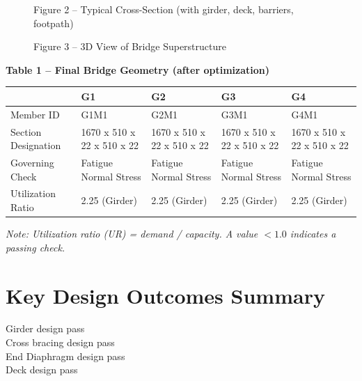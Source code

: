 \documentclass[12pt,a4paper]{report}
\numberwithin{table}{chapter}
\numberwithin{figure}{chapter}
\begin{document}
\newpage

\begin{figure}[H]
\centering
{}
\caption*{Figure 2 -- Typical Cross-Section (with girder, deck, barriers, footpath)}
\end{figure}

\begin{figure}[H]
\centering
{}
\caption*{Figure 3 -- 3D View of Bridge Superstructure}
\end{figure}

\noindent\textbf{Table 1 -- Final Bridge Geometry (after optimization)}

\vspace{0.4em}
\noindent
\begin{tabular}{|C{2.8cm}|C{3.0cm}|C{3.0cm}|C{3.0cm}|C{3.0cm}|}
\hline
  \textbf{} &
  \textbf{G1} &
  \textbf{G2} &
  \textbf{G3} &
  \textbf{G4} \\
\hline
Member ID & G1M1 & G2M1 & G3M1 & G4M1 \\
\hline
Section Designation & 1670 x 510 x 22 x 510 x 22 & 1670 x 510 x 22 x 510 x 22 & 1670 x 510 x 22 x 510 x 22 & 1670 x 510 x 22 x 510 x 22 \\
\hline
Governing Check & Fatigue Normal Stress & Fatigue Normal Stress & Fatigue Normal Stress & Fatigue Normal Stress \\
\hline
Utilization Ratio & 2.25 (Girder) & 2.25 (Girder) & 2.25 (Girder) & 2.25 (Girder) \\
\hline
\end{tabular}

\vspace{0.4em}
\noindent\textit{Note: Utilization ratio (UR) = demand / capacity. A value $< 1.0$ indicates a passing check.}

\vspace{1em}

\section*{Key Design Outcomes Summary}
\label{sec:key-outcomes}

\noindent Girder design pass \\
Cross bracing design pass \\
End Diaphragm design pass \\
Deck design pass
\end{document}
